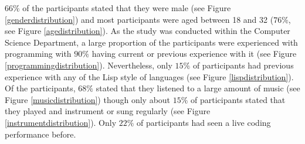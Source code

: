 \documentclass{article}
\begin{document}
$66\%$ of the participants stated that they were male (see Figure \ref{genderdistribution}) and most participants were aged between 18 and 32 ($76\%$, see Figure \ref{agedistribution}). As the study was conducted within the Computer Science Department, a large proportion of the participants were experienced with programming with $90\%$ having current or previous experience with it (see Figure \ref{programmingdistribution}). Nevertheless, only $15\%$ of participants had previous experience with any of the Lisp style of languages (see Figure \ref{lispdistribution}).\\

Of the participants, $68\%$ stated that they listened to a large amount of music (see Figure \ref{musicdistribution}) though only about $15\%$ of participants stated that they played and instrument or sung regularly (see Figure \ref{instrumentdistribution}). Only $22\%$ of participants had seen a live coding performance before.\\
\end{document}
